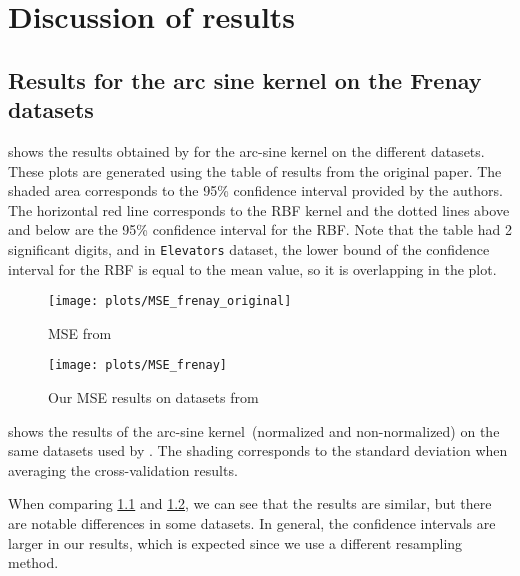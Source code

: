 \chapter{Discussion of results}
\label{sec:analysis}

\section{Results for the arc sine kernel on the Frenay datasets}

 shows the results obtained by
\textcite{frenayParameterinsensitiveKernelExtreme2011} for the arc-sine kernel
on the different datasets. These plots are generated using the table of results
from the original paper. The shaded area corresponds to the 95\% confidence
interval provided by the authors. The horizontal red line corresponds to the RBF kernel and
the dotted lines above and below are the 95\% confidence interval for the RBF.
Note that the table had 2 significant digits, and in \texttt{Elevators} dataset, the
lower bound of the confidence interval for the RBF is equal to the mean value,
so it is overlapping in the plot.

\begin{figure}[H]
    \texttt{[image: plots/MSE\_frenay\_original]}
    \caption{MSE from \cite{frenayParameterinsensitiveKernelExtreme2011}}
    \label{fig:mse-frenay-original}
\end{figure}

\begin{figure}[H]
    \texttt{[image: plots/MSE\_frenay]}
    \caption{Our MSE results on datasets from \cite{frenayParameterinsensitiveKernelExtreme2011}}
    \label{fig:mse-frenay}
\end{figure}

 shows the results of the arc-sine
kernel~(normalized and non-normalized) on the same datasets used by \textcite{frenayParameterinsensitiveKernelExtreme2011}. The shading corresponds to the standard deviation when averaging the
cross-validation results.

When comparing \cref{fig:mse-frenay-original} and \cref{fig:mse-frenay}, we
can see that the results are similar, but there are notable differences in some
datasets. In general, the confidence intervals are larger in our results, which
is expected since we use a different resampling method.

